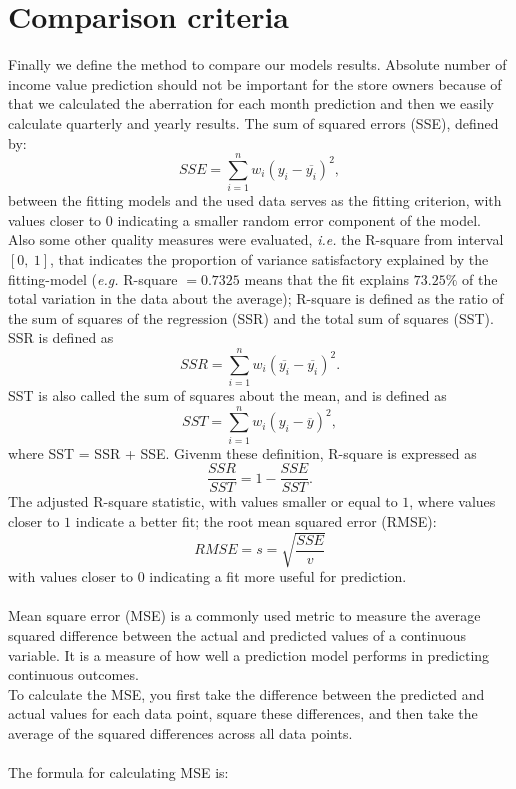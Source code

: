 \section{Comparison criteria} \label{subsec:comparison}
Finally we define the method to compare our models results.
Absolute number of income value prediction should not be important for the store owners because of that we calculated the aberration for each month
prediction and then we easily calculate quarterly and yearly results.
The sum of squared errors (SSE), defined by:
$$SSE = \sum^n_{i=1}w_i(y_i - \overline{y_i})^2,$$
between the fitting models and the used data serves as the fitting criterion,
with values closer to $0$ indicating a smaller random error component of the model.
Also some other quality measures were evaluated, \textit{i.e.} the R-square from interval $[0,\ 1]$,
that indicates the proportion of variance satisfactory explained by the fitting-model (\textit{e.g.}  R-square $= 0.7325$ means
that the fit explains $73.25\%$ of the total variation in the data about the average);
R-square is defined as the ratio of the sum of squares of the regression (SSR) and the total sum of squares (SST).
SSR is defined as
$$SSR = \sum_{i=1}^nw_i(\overline{y_i} - \overline{y_i})^2.$$
SST is also called the sum of squares about the mean, and is defined as
$$SST = \sum_{i=1}^nw_i(y_i - \overline{y})^2,$$
where SST = SSR + SSE. Givenm these definition, R-square is expressed as
$$\frac{SSR}{SST} = 1 - \frac{SSE}{SST}.$$
The adjusted R-square statistic, with values smaller or equal to $1$, where values closer to $1$ indicate a better fit; the root mean squared error (RMSE):\\
$$RMSE = s = \sqrt{\frac{SSE}{v}}$$
with values closer to $0$ indicating a fit more useful for prediction.\\
\\
Mean square error (MSE) is a commonly used metric to measure the average squared difference between the actual and predicted values of a continuous variable.
It is a measure of how well a prediction model performs in predicting continuous outcomes.\\
To calculate the MSE, you first take the difference between the predicted and actual values for each data point, square these differences, and then take the
average of the squared differences across all data points.\\
\\
The formula for calculating MSE is:

